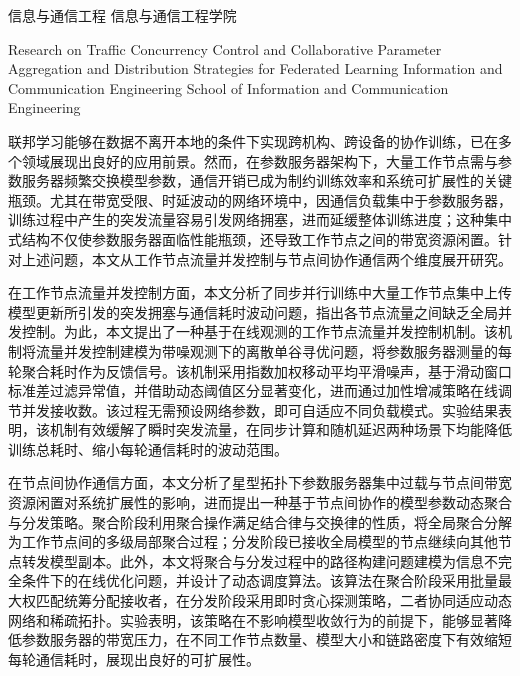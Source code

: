 \documentclass[master, vlined]{DissertUESTC}
\begin{document}
	{信息与通信工程}
	{}
	{}
	{}
	{}
	{信息与通信工程学院} %

	
	\Author{}
	\Supervisor{}{}{}{}
	\Reviewer{}{}  %
	\uestczhtitlepage

	\uestcentitlepage
	{Research on Traffic Concurrency Control and Collaborative Parameter Aggregation and Distribution Strategies for Federated Learning}
	{Information and Communication Engineering}
	{}
	{}
	{} {}
	{School of Information and Communication Engineering}
	
	\declaration[3cm]{}{}{}
	
	\zhabstract

	联邦学习能够在数据不离开本地的条件下实现跨机构、跨设备的协作训练，已在多个领域展现出良好的应用前景。然而，在参数服务器架构下，大量工作节点需与参数服务器频繁交换模型参数，通信开销已成为制约训练效率和系统可扩展性的关键瓶颈。尤其在带宽受限、时延波动的网络环境中，因通信负载集中于参数服务器，训练过程中产生的突发流量容易引发网络拥塞，进而延缓整体训练进度；这种集中式结构不仅使参数服务器面临性能瓶颈，还导致工作节点之间的带宽资源闲置。针对上述问题，本文从工作节点流量并发控制与节点间协作通信两个维度展开研究。

	在工作节点流量并发控制方面，本文分析了同步并行训练中大量工作节点集中上传模型更新所引发的突发拥塞与通信耗时波动问题，指出各节点流量之间缺乏全局并发控制。为此，本文提出了一种基于在线观测的工作节点流量并发控制机制。该机制将流量并发控制建模为带噪观测下的离散单谷寻优问题，将参数服务器测量的每轮聚合耗时作为反馈信号。该机制采用指数加权移动平均平滑噪声，基于滑动窗口标准差过滤异常值，并借助动态阈值区分显著变化，进而通过加性增减策略在线调节并发接收数。该过程无需预设网络参数，即可自适应不同负载模式。实验结果表明，该机制有效缓解了瞬时突发流量，在同步计算和随机延迟两种场景下均能降低训练总耗时、缩小每轮通信耗时的波动范围。

	在节点间协作通信方面，本文分析了星型拓扑下参数服务器集中过载与节点间带宽资源闲置对系统扩展性的影响，进而提出一种基于节点间协作的模型参数动态聚合与分发策略。聚合阶段利用聚合操作满足结合律与交换律的性质，将全局聚合分解为工作节点间的多级局部聚合过程；分发阶段已接收全局模型的节点继续向其他节点转发模型副本。此外，本文将聚合与分发过程中的路径构建问题建模为信息不完全条件下的在线优化问题，并设计了动态调度算法。该算法在聚合阶段采用批量最大权匹配统筹分配接收者，在分发阶段采用即时贪心探测策略，二者协同适应动态网络和稀疏拓扑。实验表明，该策略在不影响模型收敛行为的前提下，能够显著降低参数服务器的带宽压力，在不同工作节点数量、模型大小和链路密度下有效缩短每轮通信耗时，展现出良好的可扩展性。
\end{document}
